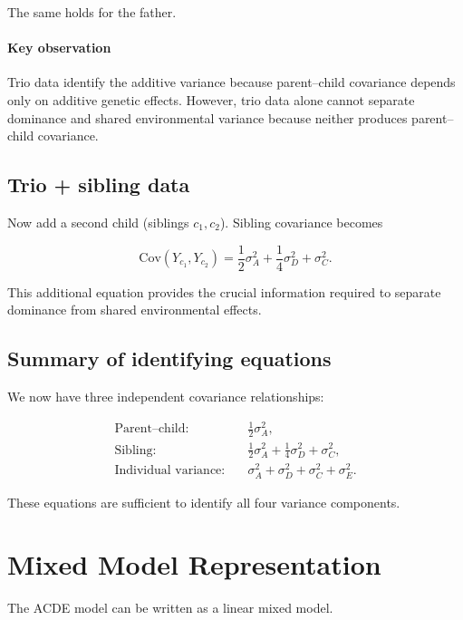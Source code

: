 \documentclass[11pt]{article}
\begin{document}
The same holds for the father.

\paragraph{Key observation}

Trio data identify the additive variance because parent–child covariance 
depends only on additive genetic effects. However, trio data alone cannot 
separate dominance and shared environmental variance because neither produces 
parent–child covariance.

\subsection{Trio + sibling data}

Now add a second child (siblings $c_1,c_2$).  
Sibling covariance becomes

\begin{equation}
\mathrm{Cov}(Y_{c_1},Y_{c_2})
= \frac{1}{2}\sigma_A^2 + \frac{1}{4}\sigma_D^2 + \sigma_C^2.
\end{equation}

This additional equation provides the crucial information required to 
separate dominance from shared environmental effects.

\subsection{Summary of identifying equations}

We now have three independent covariance relationships:

\begin{align}
\text{Parent--child:} \quad
& \frac{1}{2}\sigma_A^2, \\
\text{Sibling:} \quad
& \frac{1}{2}\sigma_A^2 + \frac{1}{4}\sigma_D^2 + \sigma_C^2, \\
\text{Individual variance:} \quad
& \sigma_A^2 + \sigma_D^2 + \sigma_C^2 + \sigma_E^2.
\end{align}

These equations are sufficient to identify all four variance components.

\section{Mixed Model Representation}

The ACDE model can be written as a linear mixed model.
\end{document}
